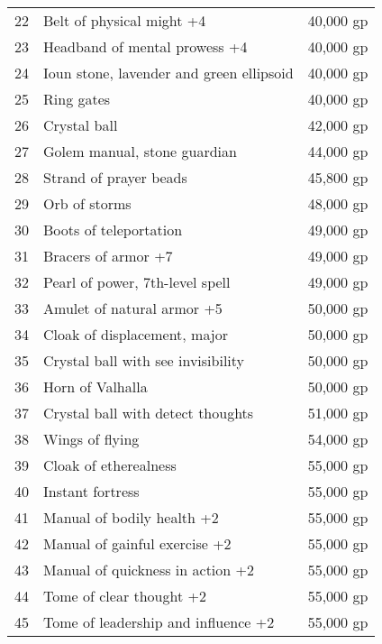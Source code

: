 \begin{table}[]
\begin{tabular}{lll}
22  & Belt of physical might +4                      & 40,000 gp    \\
23  & Headband of mental prowess +4                  & 40,000 gp    \\
24  & Ioun stone, lavender and green ellipsoid       & 40,000 gp    \\
25  & Ring gates                                     & 40,000 gp    \\
26  & Crystal ball                                   & 42,000 gp    \\
27  & Golem manual, stone guardian                   & 44,000 gp    \\
28  & Strand of prayer beads                         & 45,800 gp    \\
29  & Orb of storms                                  & 48,000 gp    \\
30  & Boots of teleportation                         & 49,000 gp    \\
31  & Bracers of armor +7                            & 49,000 gp    \\
32  & Pearl of power, 7th-level spell                & 49,000 gp    \\
33  & Amulet of natural armor +5                     & 50,000 gp    \\
34  & Cloak of displacement, major                   & 50,000 gp    \\
35  & Crystal ball with see invisibility             & 50,000 gp    \\
36  & Horn of Valhalla                               & 50,000 gp    \\
37  & Crystal ball with detect thoughts              & 51,000 gp    \\
38  & Wings of flying                                & 54,000 gp    \\
39  & Cloak of etherealness                          & 55,000 gp    \\
40  & Instant fortress                               & 55,000 gp    \\
41  & Manual of bodily health +2                     & 55,000 gp    \\
42  & Manual of gainful exercise +2                  & 55,000 gp    \\
43  & Manual of quickness in action +2               & 55,000 gp    \\
44  & Tome of clear thought +2                       & 55,000 gp    \\
45  & Tome of leadership and influence +2            & 55,000 gp    \\

\end{tabular}
\end{table}
